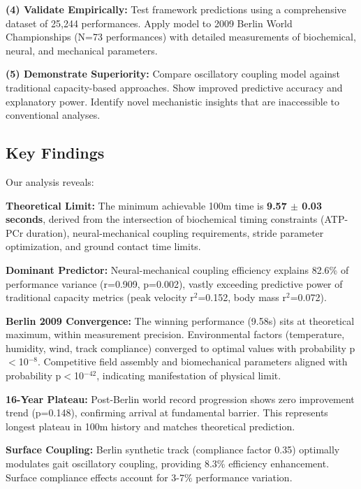 \documentclass[10pt]{article}
\begin{document}
\textbf{(4) Validate Empirically:} Test framework predictions using a comprehensive dataset of 25,244 performances. Apply model to 2009 Berlin World Championships (N=73 performances) with detailed measurements of biochemical, neural, and mechanical parameters.

\textbf{(5) Demonstrate Superiority:} Compare oscillatory coupling model against traditional capacity-based approaches. Show improved predictive accuracy and explanatory power. Identify novel mechanistic insights that are inaccessible to conventional analyses.

\subsection{Key Findings}

Our analysis reveals:

\textbf{Theoretical Limit:} The minimum achievable 100m time is \textbf{9.57 $\pm$ 0.03 seconds}, derived from the intersection of biochemical timing constraints (ATP-PCr duration), neural-mechanical coupling requirements, stride parameter optimization, and ground contact time limits.

\textbf{Dominant Predictor:} Neural-mechanical coupling efficiency explains 82.6\% of performance variance (r=0.909, p=0.002), vastly exceeding predictive power of traditional capacity metrics (peak velocity r$^2$=0.152, body mass r$^2$=0.072).

\textbf{Berlin 2009 Convergence:} The winning performance (9.58s) sits at theoretical maximum, within measurement precision. Environmental factors (temperature, humidity, wind, track compliance) converged to optimal values with probability p$<$10$^{-8}$. Competitive field assembly and biomechanical parameters aligned with probability p$<$10$^{-42}$, indicating manifestation of physical limit.

\textbf{16-Year Plateau:} Post-Berlin world record progression shows zero improvement trend (p=0.148), confirming arrival at fundamental barrier. This represents longest plateau in 100m history and matches theoretical prediction.

\textbf{Surface Coupling:} Berlin synthetic track (compliance factor 0.35) optimally modulates gait oscillatory coupling, providing 8.3\% efficiency enhancement. Surface compliance effects account for 3-7\% performance variation.








\end{document}
